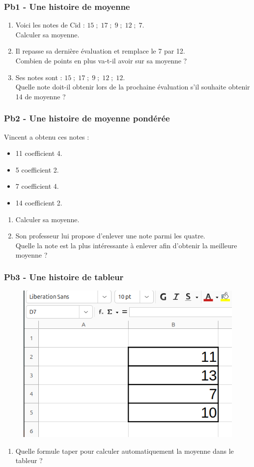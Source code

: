 \subsubsection*{Pb1 - Une histoire de moyenne}

\begin{enumerate}
  \item[1.] Voici les notes de Cid : $15 \; ; \; 17 \; ; \; 9 \; ; \; 12 \; ; \; 7$.\\
  Calculer sa moyenne.
  \item[2.] Il repasse sa dernière évaluation et remplace le 7 par 12. \\
  Combien de points en plus va-t-il avoir sur sa moyenne ?
  \item[3.] Ses notes sont : $15 \; ; \; 17 \; ; \; 9 \; ; \; 12 \; ; \; 12$.\\
  Quelle note doit-il obtenir lors de la prochaine évaluation s'il souhaite obtenir 14 de moyenne ?
\end{enumerate}


\subsubsection*{Pb2 - Une histoire de moyenne pondérée}

\begin{multicols}{2}\noindent
Vincent a obtenu ces notes : 

\begin{itemize}[label={$\bullet$}]
  \item 11 coefficient 4. 
  \item 5 coefficient 2. 
  \item 7 coefficient 4. 
  \item 14 coefficient 2. 
\end{itemize} \columnbreak

\begin{enumerate}
  \item[1.] Calculer sa moyenne.
  \item[2.] Son professeur lui propose d'enlever une note parmi les quatre. \\
  Quelle la note est la plus intéressante à enlever afin d'obtenir la meilleure moyenne ?
\end{enumerate} 
\end{multicols}


\subsubsection*{Pb3 - Une histoire de tableur}

\begin{figure}[H]
  \centering
  \includegraphics[width=0.5\linewidth]{5x4-statistiques/tableur.png}
\end{figure}

\begin{enumerate}
  \item[1.] Quelle formule taper pour calculer automatiquement la moyenne dans le tableur ?
\end{enumerate} 

